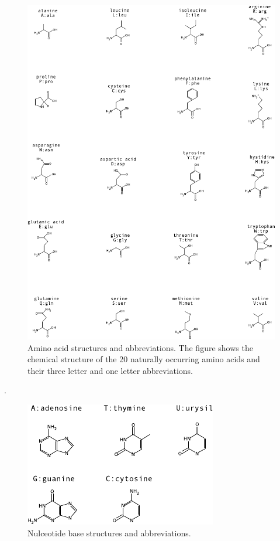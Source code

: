        \begin{figure}[ptbh]
        \centering
        \includegraphics[width=\textwidth]{Body/Images-appa/aas.pdf}
        \caption[Amino acid structures and abbreviations]{Amino acid structures and abbreviations.  The figure shows the chemical
structure of the 20 naturally occurring amino acids and their three letter and
one letter abbreviations.}
        \label{fig:aas} \end{figure}


.
        \begin{figure}[bthp]
        \centering
        \includegraphics{Body/Images-appa/bases.pdf}
        \caption[Nucleotide base structures and abbreviations]{Nulceotide base structures and abbreviations.}
        \label{fig:bases} \end{figure}



